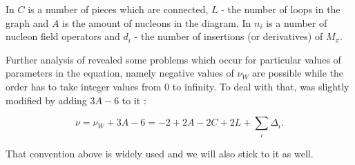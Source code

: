 In  $C$ is a number of pieces which are connected, $L$ - the number of loops in the graph
and $A$ is the amount of nucleons in the diagram.
In  $n_i$ is a number of nucleon field operators and $d_i$ - the number of insertions
(or derivatives) of  $M_\pi$.

Further analysis of  revealed some problems which occur 
for particular values of parameters in the equation, namely negative values of $\nu_W$ 
are possible while the order has to take integer values from 0 to infinity.
To deal with that,  
was slightly modified by adding $3A - 6$ to it  \cite{Machleidt2011, EPELBAUM2006_PROGRESS}:

\begin{equation}
    \nu = \nu_W + 3A  - 6 = -2 + 2A - 2C + 2L + \sum_i \Delta_i.
    \label{powers_corrected}
\end{equation}

That convention above is widely used and we will also stick to it as well.

